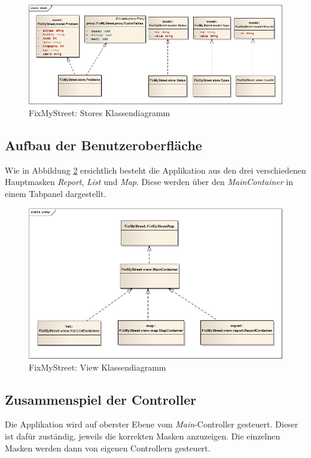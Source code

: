 \begin{figure}[H]
	\centering
	\includegraphics[width=\textwidth]{images/usecase2-fixmystreet/uml/fixmystreet-store-classmodel}
	\caption{FixMyStreet: Stores Klassendiagramm}
	\label{fixmystreet-store-classmodel}
\end{figure}

\subsection{Aufbau der Benutzeroberfläche}
Wie in Abbildung \ref{fixmystreet-view-classmodel} ersichtlich besteht die Applikation aus den drei verschiedenen Hauptmasken \emph{Report}, \emph{List} und \emph{Map}. Diese werden über den \emph{MainContainer} in einem Tabpanel dargestellt.

\begin{figure}[H]
	\centering
	\includegraphics[width=\textwidth]{images/usecase2-fixmystreet/uml/fixmystreet-view-classmodel}
	\caption{FixMyStreet: View Klassendiagramm}
	\label{fixmystreet-view-classmodel}
\end{figure}


\subsection{Zusammenspiel der Controller}
Die Applikation wird auf oberster Ebene vom \emph{Main}-Controller gesteuert. Dieser ist dafür zuständig, jeweils die korrekten Masken anzuzeigen. Die einzelnen Masken werden dann von eigenen Controllern gesteuert.

